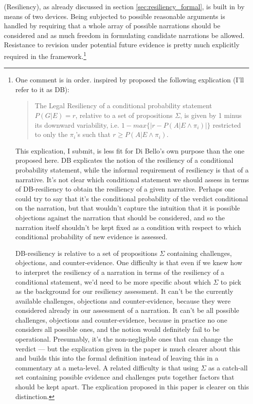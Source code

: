 \documentclass[10pt,leqno]{article}
\newcommand{\et}{\wedge}
\begin{document}
(Resiliency), as already discussed in section \ref{sec:resiliency_formal}, is built in by means of two devices. Being subjected to possible reasonable arguments is handled by requiring that   a whole array of possible narrations should be considered and as much freedom in formulating candidate narrations be allowed. Resistance to revision under potential future evidence is pretty much explicitly required in the framework.\footnote{One comment is in order. \citet[77]{di2013statistics} inspired by  \citet{Skyrms1977Resiliency-prop} 
 proposed the following explication (I'll refer to it as DB):
\begin{quote}
The {\sc Legal Resiliency} of a conditional probability statement \linebreak $P(G\vert E) = r$, relative to a set of propositions $\Sigma$, is given by 1 minus its downward variability, i.e. $1 - max\{\vert r - P (A\vert E \et \pi_i)\vert\}$ restricted to only the $\pi_i$’s such that $r \geq P (A\vert E \et \pi_i)$.
\end{quote}
This explication, I submit, is less fit for Di Bello's own purpose than the one proposed here.  DB explicates the notion of the resiliency of a conditional probability statement, while the informal requirement of resiliency is that of a narrative. It's not clear which conditional statement we should assess in terms of   DB-resiliency  to obtain  the resiliency of a given narrative.   Perhaps one could try to say that it's the conditional probability of the verdict conditional on the narration, but that wouldn't capture the intuition that it is  possible objections against the narration that  should be considered, and so the narration itself shouldn't be kept fixed as a condition with respect to which conditional probability of new evidence is assessed.


 DB-resiliency is relative to a set of propositions $\Sigma$ containing challenges, objections, and counter-evidence. One difficulty is that even if we knew how to interpret the resiliency of a narration in terms of the resiliency of a conditional statement, we'd need to be more specific about which $\Sigma$ to pick as the background for our resiliency assessment. It can't be the currently available challenges, objections and counter-evidence, because they were considered already in our assessment of a narration. It can't be all possible challenges, objections and counter-evidence, because in practice no one considers all possible ones, and the notion would definitely fail to be operational. Presumably, it's the non-negligible ones that can change the verdict --- but the explication given in the paper is much clearer about this and builds this into the formal definition instead of leaving this in a commentary at a meta-level. A related difficulty is that using $\Sigma$ as a catch-all set containing possible evidence and challenges puts together factors that should be kept apart.  The explication proposed in this paper is clearer on this distinction.} 
 
\end{document}
